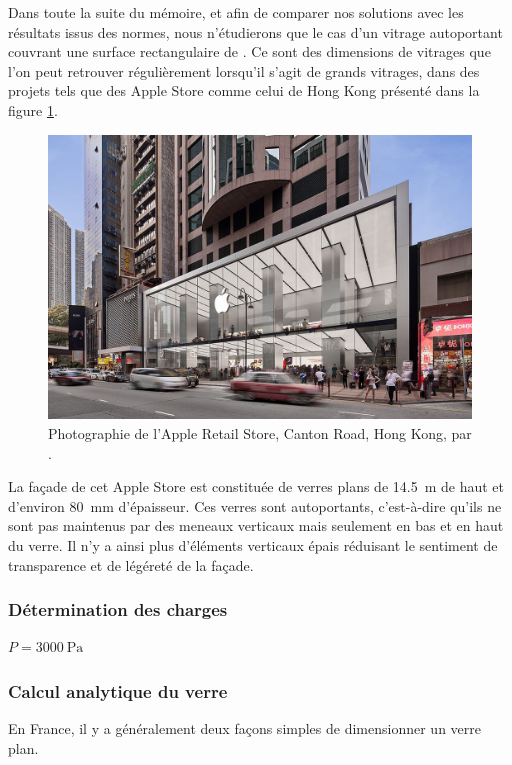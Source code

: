 \documentclass[11pt,titlepage]{article}
\begin{document}
Dans toute la suite du mémoire, et afin de comparer nos solutions avec les résultats issus des normes, nous n'étudierons que le cas d'un vitrage autoportant couvrant une surface rectangulaire de . Ce sont des dimensions de vitrages que l'on peut retrouver régulièrement lorsqu'il s'agit de grands vitrages, dans des projets tels que des Apple Store comme celui de Hong Kong présenté dans la figure \ref{fig:ApplStore}.
\begin{figure}[H]
    \centering
    \includegraphics[width=\textwidth]{img/AppleCantonRoad_c_GrischaRueschendorf__2_.jpg}
    \caption{Photographie de l'Apple Retail Store, Canton Road, Hong Kong, par \Textcite{AppleStore}.}
    \label{fig:ApplStore}
\end{figure}

La façade de cet Apple Store est constituée de verres plans de \qty{14.5}{\meter} de haut et d'environ \qty{80}{\milli\meter} d'épaisseur. Ces verres sont autoportants, c'est-à-dire qu'ils ne sont pas maintenus par des meneaux verticaux mais seulement en bas et en haut du verre. Il n'y a ainsi plus d'éléments verticaux épais réduisant le sentiment de transparence et de légéreté de la façade.

\subsubsection{Détermination des charges}
$P = \qty{3000}{\pascal}$
\subsubsection{Calcul analytique du verre}
En France, il y a généralement deux façons simples de dimensionner un verre plan. 
\end{document}
